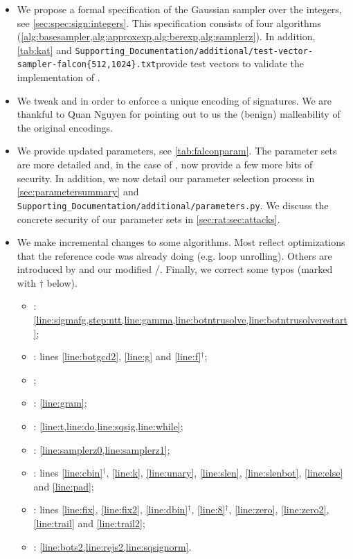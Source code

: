 \begin{itemize}
	\item We propose a formal specification of the Gaussian sampler over the integers, see \cref{sec:spec:sign:integers}. This specification consists of four algorithms (\cref{alg:basesampler,alg:approxexp,alg:berexp,alg:samplerz}). In addition, \cref{tab:kat} and {\small\tt Supporting\_Documentation/additional/test-vector-sampler-falcon\{512,1024\}.txt}\newline provide test vectors to validate the implementation of \samplerz.
	\item We tweak \longcompress and \longdecompress in order to enforce a unique encoding of signatures. We are thankful to Quan Nguyen for pointing out to us the (benign) malleability of the original encodings.
	\item We provide updated parameters, see \cref{tab:falconparam}. The parameter sets are more detailed and, in the case of , now provide a few more bits of security. In addition, we now detail our parameter selection process in \cref{sec:parametersummary} and {\small\tt Supporting\_Documentation/additional/parameters.py}. We discuss the concrete security of our parameter sets in \cref{sec:rat:sec:attacks}.

	\item We make incremental changes to some algorithms. Most reflect optimizations that the reference code was already doing (e.g. loop unrolling). Others are introduced by \samplerz and our modified \compress/\decompress.
	Finally, we correct some typos (marked with $\dagger$ below).

	\begin{multicols*}{2}
	\begin{itemize}
	\setlength\itemsep{.4em}
	\item
	\ntrugen:	\cref{line:sigmafg,step:ntt,line:gamma,line:botntrusolve,line:botntrusolverestart};
	\item
	\ntrusolve:	lines \ref{line:botgcd2}, \ref{line:g} and \ref{line:f}${}^\dagger$;
	\item
	\ldlalgo;
	\item
	\ffldl:	\cref{line:gram};
	\item
	\sign: \cref{line:t,line:do,line:sqsig,line:while};
	\item
	\ffsampling:
	\cref{line:samplerz0,line:samplerz1};
	\item
	\compress: lines \ref{line:cbin}${}^\dagger$, \ref{line:k}, \ref{line:unary}, \ref{line:slen}, \ref{line:slenbot}, \ref{line:else} and \ref{line:pad};
	\item
	\decompress:
	lines \ref{line:fix}, \ref{line:fix2}, \ref{line:dbin}${}^\dagger$, \ref{line:8}${}^\dagger$, \ref{line:zero}, \ref{line:zero2}, \ref{line:trail} and \ref{line:trail2};
	\item
	\verify:
	\cref{line:bots2,line:rejs2,line:sqsignorm}.
	\end{itemize}
	\end{multicols*}
\end{itemize}
